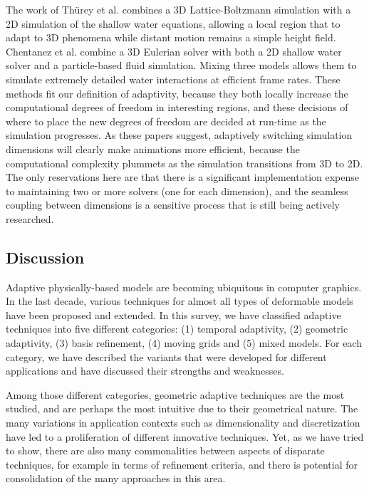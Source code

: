 The work of Th\"urey et al. \cite{Thurey2006:Coupling} combines a 3D Lattice-Boltzmann simulation with a 2D simulation of the shallow water equations, allowing a local region that to adapt to 3D phenomena while distant motion remains a simple height field. Chentanez et al. \cite{Chentanez2014} combine a 3D Eulerian solver with both a 2D shallow water solver and a particle-based fluid simulation. Mixing three models allows them to simulate extremely detailed water interactions at efficient frame rates. These methods fit our definition of adaptivity, because they both locally increase the computational degrees of freedom in interesting regions, and these decisions of where to place the new degrees of freedom are decided at run-time as the simulation progresses. As these papers suggest, adaptively switching simulation dimensions will clearly make animations more efficient, because the computational complexity plummets as the simulation transitions from 3D to 2D. The only reservations here are that there is a significant implementation expense to maintaining two or more solvers (one for each dimension), and the seamless coupling between dimensions is a sensitive process that is still being actively researched.


\subsection{Discussion} \label{sec conclusion}

Adaptive physically-based models are becoming ubiquitous in computer graphics.
In the last decade, various techniques for almost all types of deformable models have been proposed and extended.
In this survey, we have classified adaptive techniques into five different categories: (1) temporal adaptivity, (2) geometric adaptivity, (3) basis refinement, (4) moving grids and (5) mixed models.
For each category, we have described the variants that were developed for different applications and have discussed their strengths and weaknesses.

Among those different categories, geometric adaptive techniques are the most studied, and are perhaps the most intuitive due to their geometrical nature.
The many variations in application contexts such as dimensionality and discretization have led to a proliferation of different innovative techniques.
Yet, as we have tried to show, there are also many commonalities between aspects of disparate techniques, for example in terms of refinement criteria, and there is potential for consolidation of the many approaches in this area.

